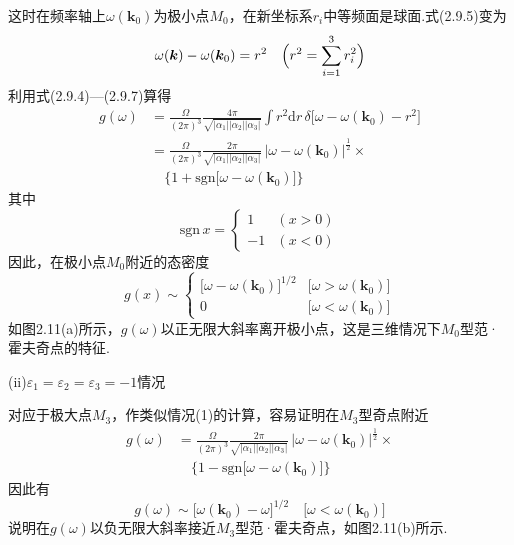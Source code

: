 这时在频率轴上$\omega(\boldsymbol{k}_0)$为极小点$M_0$，在新坐标系$r_i$中等频面是球面.式(2.9.5)变为
\begin{equation}
  \omega(\boldsymbol{k})-\omega(\boldsymbol{k}_0)=r^2
  \quad\Bigl(r^2=\sum_{i=1}^{3}r_i^2\Bigr)
\end{equation}
利用式(2.9.4)—(2.9.7)算得
\begin{equation}
\begin{aligned}
  g(\omega)&=\frac{\Omega}{(2\pi)^3}
  \frac{4\pi}{\sqrt{|\alpha_1||\alpha_2||\alpha_3|}}
  \int r^2\mathrm{d}r\,\delta\bigl[\omega-\omega(\boldsymbol{k}_0)-r^2\bigr]\\
  &=\frac{\Omega}{(2\pi)^3}
  \frac{2\pi}{\sqrt{|\alpha_1||\alpha_2||\alpha_3|}}
  \,\bigl|\omega-\omega(\boldsymbol{k}_0)\bigr|^{\frac{1}{2}}\times\\
  &\quad\bigl\{1+\mathrm{sgn}\bigl[\omega-\omega(\boldsymbol{k}_0)\bigr]\bigr\}
\end{aligned}
\end{equation}
其中
\begin{equation}
  \mathrm{sgn}\,x=\begin{cases}
  1&(x>0)\\
  -1&(x<0)
  \end{cases}
\end{equation}
因此，在极小点$M_0$附近的态密度
\begin{equation}
  g(x)\sim\begin{cases}
  \bigl[\omega-\omega(\boldsymbol{k}_0)\bigr]^{1/2}
  &\bigl[\omega>\omega(\boldsymbol{k}_0)\bigr]\\
  0&\bigl[\omega<\omega(\boldsymbol{k}_0)\bigr]
  \end{cases}
\end{equation}
如图2.11(a)所示，$g(\omega)$以正无限大斜率离开极小点，这是三维情况下$M_0$型范·霍夫奇点的特征.

(ii)$\varepsilon_1=\varepsilon_2=\varepsilon_3=-1$情况

对应于极大点$M_3$，作类似情况(1)的计算，容易证明在$M_3$型奇点附近
\begin{equation}
\begin{aligned}
  g(\omega)&=\frac{\Omega}{(2\pi)^3}
  \frac{2\pi}{\sqrt{|\alpha_1||\alpha_2||\alpha_3|}}
  \,\bigl|\omega-\omega(\boldsymbol{k}_0)\bigr|^{\frac{1}{2}}\times\\
  &\quad\bigl\{1-\mathrm{sgn}\bigl[\omega-\omega(\boldsymbol{k}_0)\bigr]\bigr\}
\end{aligned}
\end{equation}
因此有
\begin{equation}
  g(\omega)\sim\bigl[\omega(\boldsymbol{k}_0)-\omega\bigr]^{1/2}
  \quad\bigl[\omega<\omega(\boldsymbol{k}_0)\bigr]
\end{equation}
说明在$g(\omega)$以负无限大斜率接近$M_3$型范·霍夫奇点，如图2.11(b)所示.

